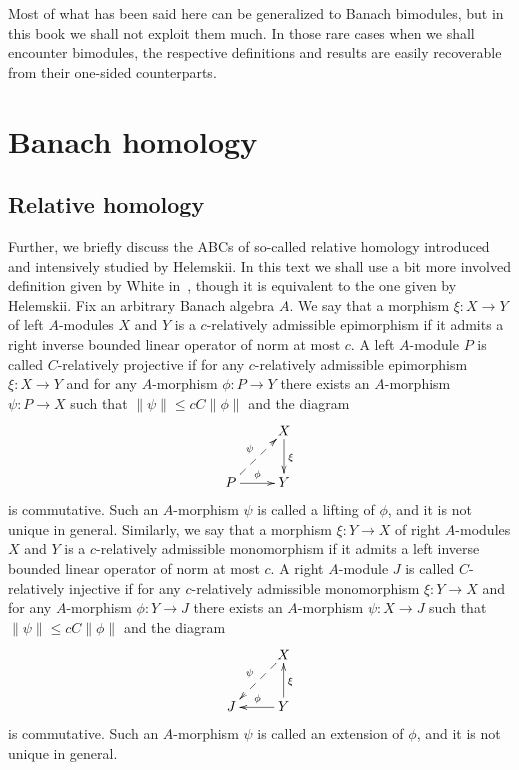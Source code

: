 Most of what has been said here can be generalized to Banach bimodules, but in
this book we shall not exploit them much. In those rare cases when we shall
encounter bimodules, the respective definitions and results are easily
recoverable from their one-sided counterparts.


\section{
  Banach homology}\label{SectionBanachHomology}


\subsection{
  Relative homology}\label{SubSectionRelativeHomology}

Further, we briefly discuss the ABCs of so-called relative homology introduced and intensively
studied by Helemskii. In this text we shall use a bit more involved
definition given by White in~\cite{WhiteInjmoduAlg}, though it is equivalent to the one
given by Helemskii. Fix an arbitrary Banach algebra $A$. We say that a
morphism $\xi:X\to Y$ of left $A$-modules $X$ and $Y$ is a $c$-relatively 
admissible epimorphism if it admits a right inverse bounded linear operator of 
norm at most $c$. A left $A$-module $P$ is called $C$-relatively projective 
if for any $c$-relatively admissible epimorphism $\xi:X\to Y$ and 
for any  $A$-morphism $\phi:P\to Y$ there exists 
an $A$-morphism $\psi:P\to X$ such 
that $\lVert \psi\rVert\leq cC\lVert \phi\rVert$ and the diagram
\[
\xymatrix{
& {X} \ar[d]^{\xi}\\  %
{P} \ar@{-->}[ur]^{\psi} \ar[r]^{\phi} &{Y}}  %
\]
is commutative. Such an $A$-morphism $\psi$ is called a lifting of $\phi$, and it is
not unique in general. Similarly,  we say that a morphism $\xi:Y\to X$ of right
$A$-modules $X$ and $Y$ is a $c$-relatively admissible monomorphism if it admits
a left inverse bounded linear operator of norm at most $c$. A right 
$A$-module $J$ is called $C$-relatively injective if for any $c$-relatively 
admissible monomorphism $\xi:Y\to X$ and for 
any $A$-morphism $\phi:Y\to J$ there exists an $A$-morphism $\psi:X\to J$ such 
that $\lVert\psi\rVert\leq cC\lVert\phi\rVert$ and the diagram
\[
\xymatrix{
& {X} \ar@{-->}[dl]_{\psi} \\  %
{J} &{Y} \ar[l]_{\phi} \ar[u]_{\xi}}  %
\]
is commutative. Such an $A$-morphism $\psi$ is called an extension of $\phi$, and it
is not unique in general.

